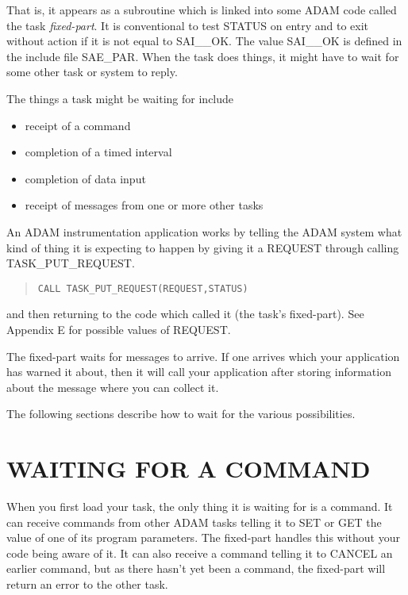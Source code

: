 That is, it appears as a subroutine which is linked into some ADAM code 
called the task {\em fixed-part}.
It is conventional to test STATUS on entry and to exit without action if it
is not equal to SAI\_\_OK. The value SAI\_\_OK is defined in the include file
SAE\_PAR.
When the task does things, it might have to wait for some other task or 
system to reply.

The things a task might be waiting for include
\begin{itemize}
\item receipt of a command
\item completion of a timed interval
\item completion of data input
\item receipt of messages from one or more other tasks
\end{itemize}
An ADAM instrumentation application works by telling the ADAM system
what kind of thing it is expecting to happen by giving it a REQUEST
through calling TASK\_PUT\_REQUEST.

\small \begin{quote} \begin{verbatim}
CALL TASK_PUT_REQUEST(REQUEST,STATUS)
\end{verbatim} \end{quote} \normalsize

and then returning to the code which called it (the task's fixed-part).
See Appendix E for possible values of REQUEST. 

The fixed-part waits for messages to arrive. If one arrives which your 
application has warned it about, then it will call your application 
after storing information about the message where you can collect it.

The following sections describe how to wait for the various 
possibilities.


\section{WAITING FOR A COMMAND}

When you first load your task, the only thing it is waiting for is a 
command. It can receive commands from other ADAM tasks telling it to SET 
or GET the value of one of its program parameters. The fixed-part 
handles this without your code being aware of it. It can also receive a 
command telling it to CANCEL an earlier command, but as there hasn't yet 
been a command, the fixed-part will return an error to the other task.

